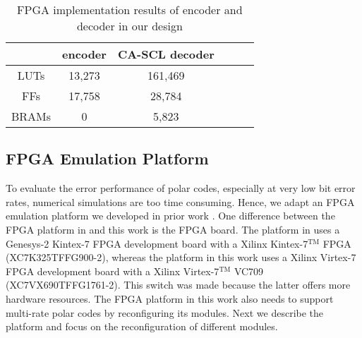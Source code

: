 \documentclass{article}
\begin{document}
\begin{table}[htbp]
\centering
\small
\caption{FPGA implementation results of encoder and decoder in our design}
\begin{tabular}{|c|c|c|c|c|c|}
\hline

&   encoder  & CA-SCL decoder  \\ \hline
LUTs  &13,273 & 161,469 \\ \hline
FFs &17,758  & 28,784\\ \hline
BRAMs  &0 & 5,823 \\ \hline

\end{tabular}
\label{tab:utilized}
\end{table}

\subsection{FPGA Emulation Platform}
To evaluate the error performance of polar codes, especially at very low bit error rates, numerical simulations are too time consuming. Hence, we adapt an FPGA emulation platform we developed in prior work \cite{sips2016}. One difference between the FPGA platform in \cite{sips2016} and this work is the FPGA board. The platform in \cite{sips2016} uses a Genesys-2 Kintex-7 FPGA development
board with a Xilinx Kintex-7$^{\text{TM}}$ FPGA (XC7K325TFFG900-2), whereas the platform in this work uses a Xilinx Virtex-7 FPGA development board with a Xilinx Virtex-7$^{\text{TM}}$ VC709 (XC7VX690TFFG1761-2). This switch was made because the latter offers more hardware resources.
The FPGA platform in this work also needs to support multi-rate polar codes by reconfiguring its modules.
Next we describe the platform and focus on the reconfiguration of different modules. 
\end{document}
